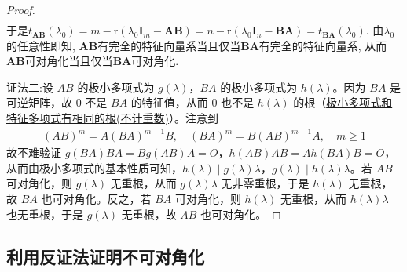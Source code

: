 \documentclass[../../main.tex]{subfiles}
\begin{document}
\begin{proof}
\begin{align*}
\end{align*}
于是\(t_{\boldsymbol{A}\boldsymbol{B}}(\lambda_0) = m - \mathrm{r}(\lambda_0\boldsymbol{I}_m - \boldsymbol{A}\boldsymbol{B}) = n - \mathrm{r}(\lambda_0\boldsymbol{I}_n - \boldsymbol{B}\boldsymbol{A}) = t_{\boldsymbol{B}\boldsymbol{A}}(\lambda_0)\). 由\(\lambda_0\)的任意性即知, \(\boldsymbol{A}\boldsymbol{B}\)有完全的特征向量系当且仅当\(\boldsymbol{B}\boldsymbol{A}\)有完全的特征向量系, 从而\(\boldsymbol{A}\boldsymbol{B}\)可对角化当且仅当\(\boldsymbol{B}\boldsymbol{A}\)可对角化.

{\color{blue}证法二:}设 $AB$ 的极小多项式为 $g(\lambda)$，$BA$ 的极小多项式为 $h(\lambda)$。因为 $BA$ 是可逆矩阵，故 $0$ 不是 $BA$ 的特征值，从而 $0$ 也不是 $h(\lambda)$ 的根（\hyperref[corollary:极小多项式和特征多项式有相同的根(不计重数)]{极小多项式和特征多项式有相同的根(不计重数)}）。注意到
\begin{align*}
(AB)^m = A(BA)^{m - 1}B, \quad (BA)^m = B(AB)^{m - 1}A, \quad m\geqslant  1
\end{align*}
故不难验证 $g(BA)BA = Bg(AB)A = O$，$h(AB)AB = Ah(BA)B = O$，从而由极小多项式的基本性质可知，$h(\lambda)\mid g(\lambda)\lambda$，$g(\lambda)\mid h(\lambda)\lambda$。若 $AB$ 可对角化，则 $g(\lambda)$ 无重根，从而 $g(\lambda)\lambda$ 无非零重根，于是 $h(\lambda)$ 无重根，故 $BA$ 也可对角化。反之，若 $BA$ 可对角化，则 $h(\lambda)$ 无重根，从而 $h(\lambda)\lambda$ 也无重根，于是 $g(\lambda)$ 无重根，故 $AB$ 也可对角化。
\end{proof}

\subsection{利用反证法证明不可对角化}
\end{document}
